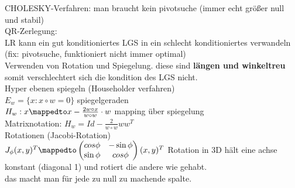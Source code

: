 \documentclass{article}
\begin{document}
	CHOLESKY-Verfahren: man braucht kein pivotsuche (immer echt größer null und stabil)\\
	QR-Zerlegung:\\
	LR kann ein gut konditioniertes LGS in ein schlecht konditioniertes verwandeln (fix: pivotsuche, funktioniert nicht immer optimal)\\
	Verwenden von Rotation und Spiegelung. diese sind \textbf{längen und winkeltreu} somit verschlechtert sich die kondition des LGS nicht.\\
	Hyper ebenen spiegeln (Householder verfahren)\\
	$E_w=\{x:x\circ w=0\}$ spiegelgeraden\\
	$H_w: x\mappedto x-\frac{2w\circ x}{w\circ w} \cdot w$ mapping über spiegelung\\
	Matrixnotation: $H_w = Id -\frac{2}{w\circ w}ww^T$\\
	Rotationen (Jacobi-Rotation)\\
	$J_\phi (x,y)^T \mappedto \begin{pmatrix}cos\phi&-\sin\phi\\\sin\phi&cos\phi\end{pmatrix}(x,y)^T$
	Rotation in 3D hält eine achse konstant (diagonal 1) und rotiert die andere wie gehabt.\\
	das macht man für jede zu null zu machende spalte.\\
\end{document}
